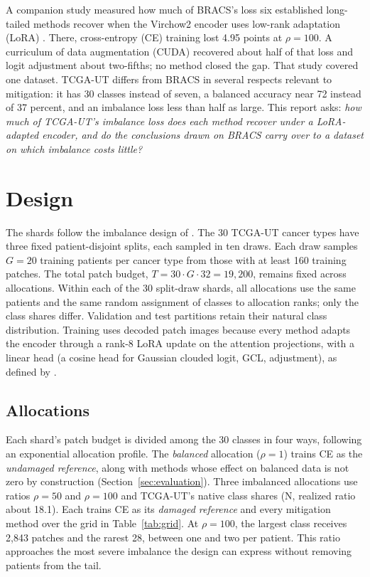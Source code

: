 \documentclass[11pt]{article}
\begin{document}
A companion study measured how much of BRACS's loss six established long-tailed methods recover when the Virchow2 encoder \citep{zimmermann2024virchow2} uses low-rank adaptation (LoRA) \citep{queisler2026mitigationBracs,queisler2026mitigationMethods}. There, cross-entropy (CE) training lost 4.95 points at $\rho=100$. A curriculum of data augmentation (CUDA) recovered about half of that loss and logit adjustment about two-fifths; no method closed the gap. That study covered one dataset. TCGA-UT differs from BRACS in several respects relevant to mitigation: it has 30 classes instead of seven, a balanced accuracy near 72 instead of 37 percent, and an imbalance loss less than half as large. This report asks: \emph{how much of TCGA-UT's imbalance loss does each method recover under a LoRA-adapted encoder, and do the conclusions drawn on BRACS carry over to a dataset on which imbalance costs little?}

\section{Design}
\label{sec:design}
The shards follow the imbalance design of \citet{queisler2026prevalenceTcga}. The 30 TCGA-UT cancer types have three fixed patient-disjoint splits, each sampled in ten draws. Each draw samples $G=20$ training patients per cancer type from those with at least 160 training patches. The total patch budget, $T=30\cdot G\cdot 32=19{,}200$, remains fixed across allocations. Within each of the 30 split-draw shards, all allocations use the same patients and the same random assignment of classes to allocation ranks; only the class shares differ. Validation and test partitions retain their natural class distribution. Training uses decoded patch images because every method adapts the encoder through a rank-8 LoRA update on the attention projections, with a linear head (a cosine head for Gaussian clouded logit, GCL, adjustment), as defined by \citet{queisler2026mitigationMethods}.

\subsection{Allocations}
Each shard's patch budget is divided among the 30 classes in four ways, following an exponential allocation profile. The \emph{balanced} allocation ($\rho=1$) trains CE as the \emph{undamaged reference}, along with methods whose effect on balanced data is not zero by construction (Section~\ref{sec:evaluation}). Three imbalanced allocations use ratios $\rho=50$ and $\rho=100$ and TCGA-UT's native class shares (N, realized ratio about 18.1). Each trains CE as its \emph{damaged reference} and every mitigation method over the grid in Table~\ref{tab:grid}. At $\rho=100$, the largest class receives 2,843 patches and the rarest 28, between one and two per patient. This ratio approaches the most severe imbalance the design can express without removing patients from the tail.
\end{document}
